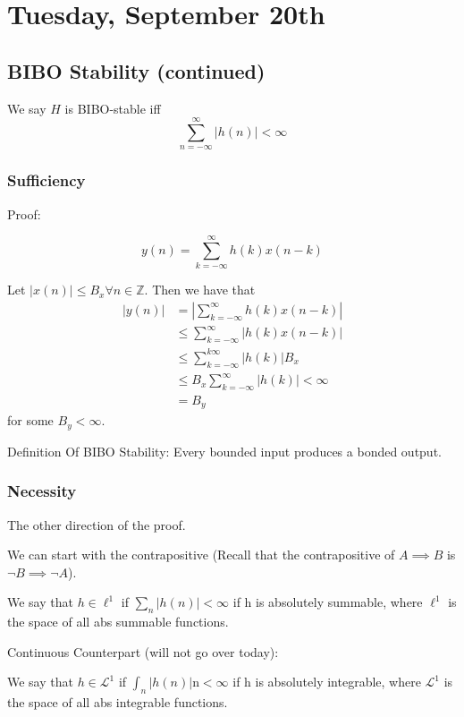 \section{Tuesday, September 20th}
\subsection{BIBO Stability (continued)}
We say $H$ is BIBO-stable iff $$\sum_{n=-\infty}^\infty |h(n)| <\infty$$

\subsubsection{Sufficiency}
Proof:
\begin{shaded}
\[
y(n)=\sum_{k=-\infty}^{\infty} h(k) x(n-k)
\]

Let $|x(n)| \leq B_x \forall n \in \mathbb{Z}$. Then we have that
\begin{align*}
|y(n)| &=\left|\sum_{k=-\infty}^{\infty} h(k) x(n-k)\right| \\
& \leq \sum_{k=-\infty}^{\infty}|h(k) x(n-k)| \\
& \leq \sum_{k=-\infty}^{k \infty}|h(k)| B_x \\
& \leq B_x \sum_{k=-\infty}^{\infty}|h(k)|<\infty \\
&=B_y
\end{align*}
for some $B_y<\infty$.
\end{shaded}
Definition Of BIBO Stability: Every bounded input produces a bonded output.

\subsubsection{Necessity}
The other direction of the proof.

We can start with the contrapositive (Recall that the contrapositive of $A\implies B$ is $\lnot B\implies\lnot A$).

We say that $h\in\ell^1$ if $\sum_n |h(n)|<\infty$ if h is absolutely summable, where $\ell^1$ is the space of all abs summable functions.

\begin{shaded}
Continuous Counterpart (will not go over today):

We say that $h\in\mathcal L^1$ if $\int_n |h(n)|\mathrm n<\infty$ if h is absolutely integrable, where $\mathcal L^1$ is the space of all abs integrable functions.
\end{shaded}

